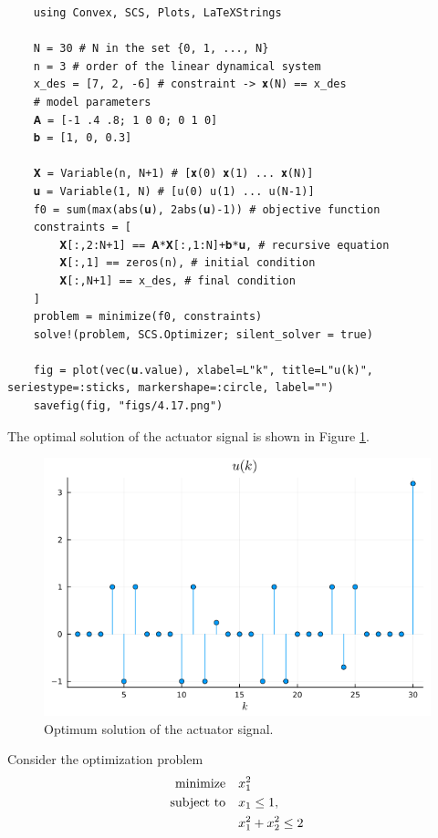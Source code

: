 \documentclass[12pt,a4paper]{article}
\begin{document}
\answer

\begin{verbatim}
    using Convex, SCS, Plots, LaTeXStrings

    N = 30 # N in the set {0, 1, ..., N}
    n = 3 # order of the linear dynamical system
    x_des = [7, 2, -6] # constraint -> 𝐱(N) == x_des
    # model parameters
    𝐀 = [-1 .4 .8; 1 0 0; 0 1 0]
    𝐛 = [1, 0, 0.3]

    𝐗 = Variable(n, N+1) # [𝐱(0) 𝐱(1) ... 𝐱(N)]
    𝐮 = Variable(1, N) # [u(0) u(1) ... u(N-1)]
    f0 = sum(max(abs(𝐮), 2abs(𝐮)-1)) # objective function
    constraints = [
        𝐗[:,2:N+1] == 𝐀*𝐗[:,1:N]+𝐛*𝐮, # recursive equation
        𝐗[:,1] == zeros(n), # initial condition
        𝐗[:,N+1] == x_des, # final condition
    ]
    problem = minimize(f0, constraints)
    solve!(problem, SCS.Optimizer; silent_solver = true)

    fig = plot(vec(𝐮.value), xlabel=L"k", title=L"u(k)", seriestype=:sticks, markershape=:circle, label="")
    savefig(fig, "figs/4.17.png")
\end{verbatim}

The optimal solution of the actuator signal is shown in Figure \ref{fig:4-17}.

\begin{figure}[H]
    \centering
    \includegraphics[scale=0.4]{figs/4.17.png}
    \caption{Optimum solution of the actuator signal.}
    \label{fig:4-17}
\end{figure}

\problem
Consider the optimization problem
\begin{align}
    \qq*{minimize} & x_1^2 \\
    \qq*{subject to} & x_1 \leq 1,\\
     & x_1^{2} + x_2^{2} \leq 2
\end{align}
\end{document}
